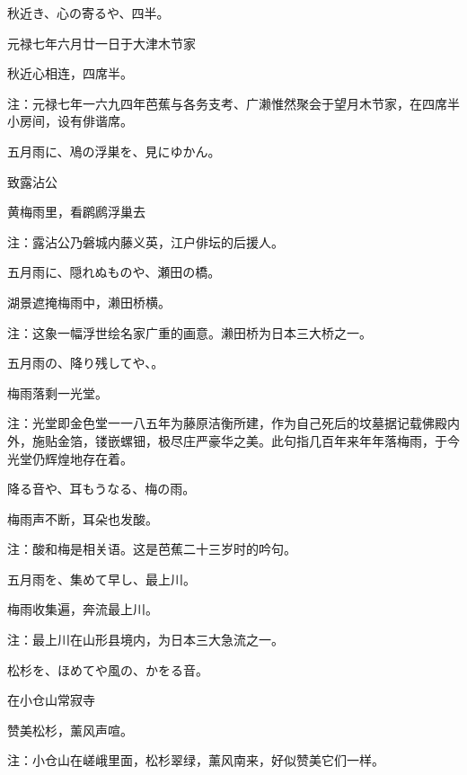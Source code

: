 \begin{haiku}
    {\FH 秋近き、心の寄るや、四半。}

    {\FK 元禄七年六月廿一日于大津木节家}

    {\FK 秋近心相连，四席半。}

    {\FT 注：元禄七年一六九四年芭蕉与各务支考、广濑惟然聚会于望月木节家，在四席半小房间，设有俳谐席。}
\end{haiku}

\begin{haiku}
    {\FH 五月雨に、鳰の浮巣を、見にゆかん。}

    {\FK 致露沾公}

    {\FK 黄梅雨里，看䴙䴘浮巢去}

    {\FT 注：露沾公乃磐城内藤义英，江户俳坛的后援人。}
\end{haiku}

\begin{haiku}
    {\FH 五月雨に、隠れぬものや、瀬田の橋。}

    {\FK 湖景遮掩梅雨中，濑田桥横。}

    {\FT 注：这象一幅浮世绘名家广重的画意。濑田桥为日本三大桥之一。}
\end{haiku}

\begin{haiku}
    {\FH 五月雨の、降り残してや、。}

    {\FK 梅雨落剩一光堂。}

    {\FT 注：光堂即金色堂一一八五年为藤原洁衡所建，作为自己死后的坟墓据记载佛殿内外，施贴金箔，镂嵌螺钿，极尽庄严豪华之美。此句指几百年来年年落梅雨，于今光堂仍辉煌地存在着。}
\end{haiku}

\begin{haiku}
    {\FH 降る音や、耳もうなる、梅の雨。}

    {\FK 梅雨声不断，耳朵也发酸。}

    {\FT 注：酸和梅是相关语。这是芭蕉二十三岁时的吟句。}
\end{haiku}

\begin{haiku}
    {\FH 五月雨を、集めて早し、最上川。}

    {\FK 梅雨收集遍，奔流最上川。}

    {\FT 注：最上川在山形县境内，为日本三大急流之一。}
\end{haiku}

\begin{haiku}
    {\FH 松杉を、ほめてや風の、かをる音。}

    {\FK 在小仓山常寂寺}

    {\FK 赞美松杉，薰风声喧。}

    {\FT 注：小仓山在嵯峨里面，松杉翠绿，薰风南来，好似赞美它们一样。}
\end{haiku}

